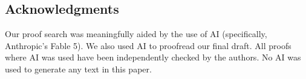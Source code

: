 \documentclass[12pt]{article}
\begin{document}

\subsection*{Acknowledgments} 

Our proof search was meaningfully aided by the use of AI (specifically, Anthropic's Fable 5). 
We also used AI to proofread our final draft.
All proofs where AI was used have been independently checked by the authors. 
No AI was used to generate any text in this paper. 


\printbibliography
\end{document}

